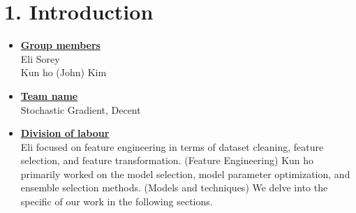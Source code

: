 \newif\ifshowsolutions
\showsolutionstrue

\newcommand{\boldline}[1]{\underline{\textbf{#1}}}

\usepackage[labelfont=bf]{caption}
\usepackage[labelfont=bf]{caption}
\usepackage[labelfont=bf]{caption}
\usepackage [english]{babel}
\usepackage [autostyle, english = american]{csquotes}

\setlength{\parindent}{0pt}



\pagestyle{fancy}

\section*{1. Introduction}
\medskip
\begin{itemize}

    \item \boldline{Group members} \\
    Eli Sorey \\
    Kun ho (John) Kim

    \item \boldline{Team name} \\
    Stochastic Gradient, Decent

    \item \boldline{Division of labour} \\
    Eli focused on feature engineering in terms of dataset cleaning, feature selection, and feature transformation. (Feature Engineering) Kun ho primarily worked on the model
    selection, model parameter optimization, and ensemble selection methods. (Models and techniques) We delve into the specific of our work in the following sections.

\end{itemize}



